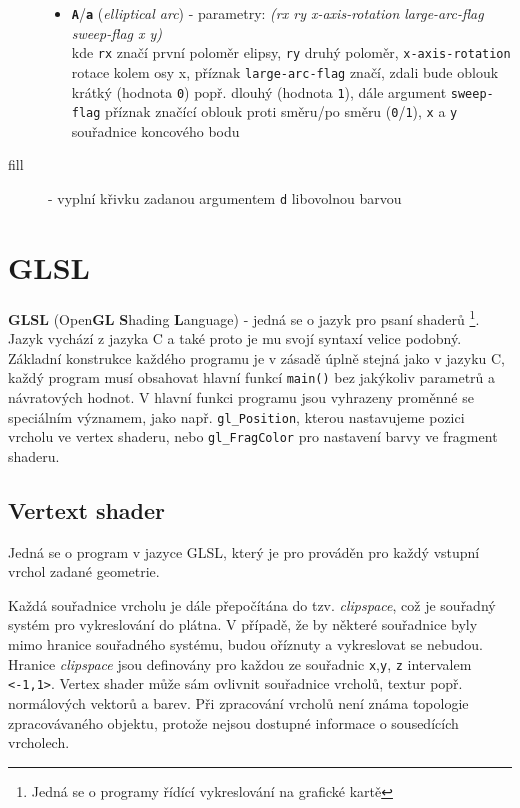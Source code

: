 \begin{description}
\begin{itemize}
		\item \texttt{\textbf{A}}/\texttt{\textbf{a}} (\textit{elliptical arc}) - parametry:  \textit{{\small (rx ry x-axis-rotation large-arc-flag sweep-flag x y)}} \\ kde \texttt{rx} značí první poloměr elipsy, \texttt{ry} druhý poloměr, \texttt{x-axis-rotation} rotace kolem osy x, příznak \texttt{large-arc-flag} značí, zdali bude oblouk krátký (hodnota \texttt{0}) popř. dlouhý (hodnota \texttt{1}), dále argument \texttt{sweep-flag} příznak značící oblouk proti směru/po směru (\texttt{0}/\texttt{1}), \texttt{x} a \texttt{y} souřadnice koncového bodu
	\end{itemize}


	\item[fill]  - vyplní křivku zadanou argumentem \texttt{d} libovolnou barvou
\end{description}




\newpage

\section{GLSL}
\textbf{GLSL} (Open\textbf{GL} \textbf{S}hading \textbf{L}anguage) - jedná se o jazyk pro psaní shaderů \footnote{Jedná se o programy řídící vykreslování na grafické kartě}. Jazyk vychází z jazyka C a také proto je mu svojí syntaxí velice podobný. Základní konstrukce každého programu je v zásadě úplně stejná jako v jazyku C, každý program musí obsahovat hlavní funkcí \texttt{main()} bez jakýkoliv parametrů a návratových hodnot. V hlavní funkci programu jsou vyhrazeny proměnné se speciálním významem, jako např. \texttt{gl\_Position}, kterou nastavujeme  pozici vrcholu ve vertex shaderu, nebo \texttt{gl\_FragColor} pro nastavení barvy ve fragment shaderu.

\subsection{Vertext shader}
Jedná se o program v jazyce GLSL, který je pro prováděn pro každý vstupní vrchol zadané geometrie. 

Každá souřadnice vrcholu je dále přepočítána do tzv. \textit{clipspace}, což je souřadný systém pro vykreslování do plátna. V případě, že by některé souřadnice byly mimo hranice souřadného systému, budou oříznuty a vykreslovat se nebudou. Hranice \textit{clipspace} jsou definovány pro každou ze souřadnic \texttt{x},\texttt{y}, \texttt{z} intervalem \texttt{<-1,1>}. Vertex shader může sám ovlivnit souřadnice vrcholů, textur popř. normálových vektorů a barev. Při zpracování vrcholů není známa topologie zpracovávaného objektu, protože nejsou dostupné informace o sousedících vrcholech. 

